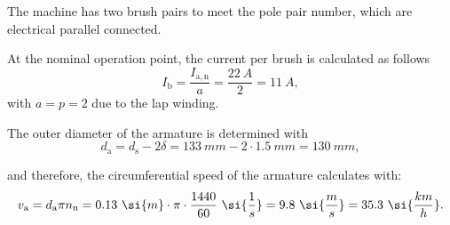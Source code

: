 \begin{solutionblock}
    The machine has two brush pairs to meet the pole pair number, which are electrical parallel connected.
    
    At the nominal operation point, the current per brush is calculated as follows
    \begin{equation}
        I_{\mathrm{b}} = \frac{I_{\mathrm{a,n}}}{a}
        = \frac{22 \ \si{A}}{2}
        = 11 \ \si{A},
    \end{equation}
    with $a = p = 2$ due to the lap winding.

    The outer diameter of the armature is determined with
    \begin{equation}
        d_{\mathrm{a}} = d_{\mathrm{s}} - 2 \delta
        = 133 \ \si{mm} - 2 \cdot 1.5 \ \si{mm}
        = 130 \ \si{mm},
    \end{equation}

    and therefore, the circumferential speed of the armature calculates with:
    \begin{equation}
        v_{\mathrm{a}} = d_{\mathrm{a}} \pi \nN
        = 0.13 \ \si{m} \cdot \pi \cdot \frac{1440}{60} \ \si{\frac{1}{s}}
        = 9.8 \ \si{\frac{m}{s}}
        = 35.3 \ \si{\frac{km}{h}}.
    \end{equation}

\end{solutionblock}


